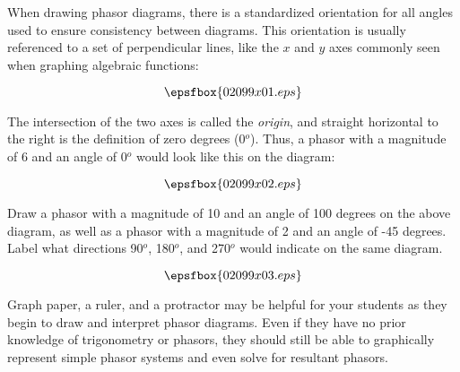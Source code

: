 

When drawing phasor diagrams, there is a standardized orientation for all angles used to ensure consistency between diagrams.  This orientation is usually referenced to a set of perpendicular lines, like the $x$ and $y$ axes commonly seen when graphing algebraic functions:

$$\epsfbox{02099x01.eps}$$

The intersection of the two axes is called the {\it origin}, and straight horizontal to the right is the definition of zero degrees (0$^{o}$).  Thus, a phasor with a magnitude of 6 and an angle of 0$^{o}$ would look like this on the diagram:

$$\epsfbox{02099x02.eps}$$

Draw a phasor with a magnitude of 10 and an angle of 100 degrees on the above diagram, as well as a phasor with a magnitude of 2 and an angle of -45 degrees.  Label what directions 90$^{o}$, 180$^{o}$, and 270$^{o}$ would indicate on the same diagram.







$$\epsfbox{02099x03.eps}$$







Graph paper, a ruler, and a protractor may be helpful for your students as they begin to draw and interpret phasor diagrams.  Even if they have no prior knowledge of trigonometry or phasors, they should still be able to graphically represent simple phasor systems and even solve for resultant phasors.




